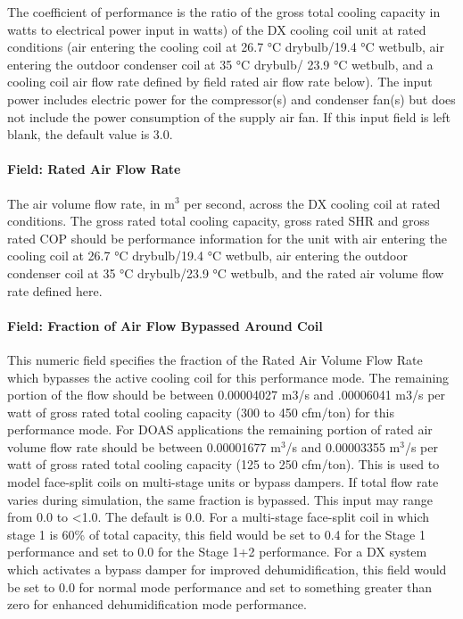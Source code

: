 The coefficient of performance is the ratio of the gross total cooling capacity in watts to electrical power input in watts) of the DX cooling coil unit at rated conditions (air entering the cooling coil at 26.7 °C drybulb/19.4 °C wetbulb, air entering the outdoor condenser coil at 35 °C drybulb/ 23.9 °C wetbulb, and a cooling coil air flow rate defined by field rated air flow rate below). The input power includes electric power for the compressor(s) and condenser fan(s) but does not include the power consumption of the supply air fan. If this input field is left blank, the default value is 3.0.

\paragraph{Field: Rated Air Flow Rate}\label{field-rated-air-flow-rate-3}

The air volume flow rate, in m\(^{3}\) per second, across the DX cooling coil at rated conditions. The gross rated total cooling capacity, gross rated SHR and gross rated COP should be performance information for the unit with air entering the cooling coil at 26.7 °C drybulb/19.4 °C wetbulb, air entering the outdoor condenser coil at 35 °C drybulb/23.9 °C wetbulb, and the rated air volume flow rate defined here.

\paragraph{Field: Fraction of Air Flow Bypassed Around Coil}\label{field-fraction-of-air-flow-bypassed-around-coil}

This numeric field specifies the fraction of the Rated Air Volume Flow Rate which bypasses the active cooling coil for this performance mode. The remaining portion of the flow should be between 0.00004027 m3/s and .00006041 m3/s per watt of gross rated total cooling capacity (300 to 450 cfm/ton) for this performance mode. For DOAS applications the remaining portion of rated air volume flow rate should be between 0.00001677 m\(^{3}\)/s and 0.00003355 m\(^{3}\)/s per watt of gross rated total cooling capacity (125 to 250 cfm/ton). This is used to model face-split coils on multi-stage units or bypass dampers. If total flow rate varies during simulation, the same fraction is bypassed. This input may range from 0.0 to \textless{}1.0. The default is 0.0. For a multi-stage face-split coil in which stage 1 is 60\% of total capacity, this field would be set to 0.4 for the Stage 1 performance and set to 0.0 for the Stage 1+2 performance. For a DX system which activates a bypass damper for improved dehumidification, this field would be set to 0.0 for normal mode performance and set to something greater than zero for enhanced dehumidification mode performance.

